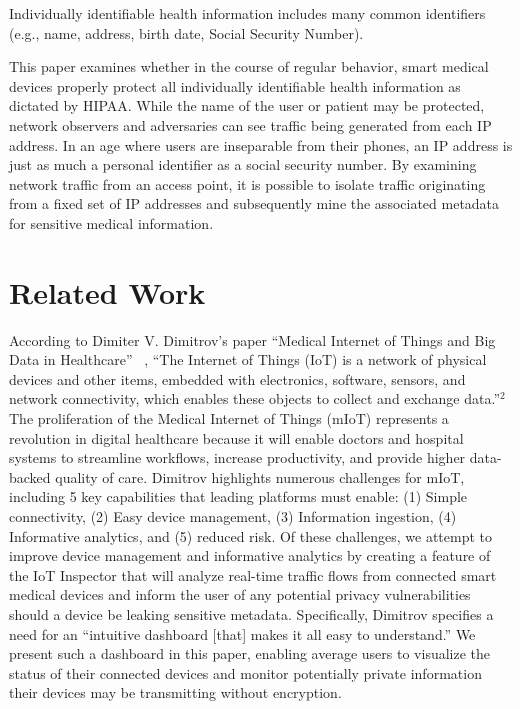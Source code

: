 Individually identifiable health information includes many common identifiers (e.g., name, address, birth date, Social Security Number).

This paper examines whether in the course of regular behavior, smart medical devices properly protect all individually identifiable health information as dictated by HIPAA. While the name of the user or patient may be protected, network observers and adversaries can see traffic being generated from each IP address. In an age where users are inseparable from their phones, an IP address is just as much a personal identifier as a social security number. By examining network traffic from an access point, it is possible to isolate traffic originating from a fixed set of IP addresses and subsequently mine the associated metadata for sensitive medical information. 


\section{Related Work}

According to Dimiter V. Dimitrov's paper ``Medical Internet of Things and Big Data in Healthcare'' ~\cite{dimitrovIoT}, ``The Internet of Things (IoT) is a network of physical devices and other items, embedded with electronics, software, sensors, and network connectivity, which enables these objects to collect and exchange data.''$^2$ The proliferation of the Medical Internet of Things (mIoT) represents a revolution in digital healthcare because it will enable doctors and hospital systems to streamline workflows, increase productivity, and provide higher data-backed quality of care. Dimitrov highlights numerous challenges for mIoT, including 5 key capabilities that leading platforms must enable: (1) Simple connectivity, (2) Easy device management, (3) Information ingestion, (4) Informative analytics, and (5) reduced risk. Of these challenges, we attempt to improve device management and informative analytics by creating a feature of the IoT Inspector that will analyze real-time traffic flows from connected smart medical devices and inform the user of any potential privacy vulnerabilities should a device be leaking sensitive metadata. Specifically, Dimitrov specifies a need for an ``intuitive dashboard [that] makes it all easy to understand.'' We present such a dashboard in this paper, enabling average users to visualize the status of their connected devices and monitor potentially private information their devices may be transmitting without encryption. 

